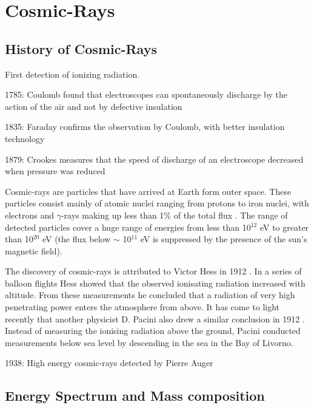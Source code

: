 \chapter[Cosmic-Rays]{\centering Cosmic-Rays \\}\label{Ch:Cosmic-rays}

\section{History of Cosmic-Rays}

First detection of ionizing radiation. 

1785: Coulomb found that 
electroscopes can spontaneously 
discharge by the action of the air 
and not by defective insulation

1835: Faraday confirms the 
observation by Coulomb, with 
better insulation technology

1879: Crookes measures that the 
speed of discharge of an 
electroscope decreased when 
pressure was reduced 

Cosmic-rays are particles that have arrived at Earth form outer space. These particles consist mainly of atomic nuclei ranging from protons to iron nuclei, with electrons and $\gamma$-rays making up less than 1\% of the total flux \cite{2007PhDT.........4Y}. The range of detected particles cover a huge range of energies from less than 10$^{12}$ eV to greater than 10$^{20}$ eV (the flux below $\sim$ 10$^{11}$ eV is suppressed by the presence of the sun's magnetic field).

The discovery of cosmic-rays is attributed to Victor Hess in 1912 \cite{hess}. In a series of balloon flights Hess showed that the observed ionisating radiation increased with altitude. From these measurements he concluded that a radiation of very high penetrating power enters the atmosphere from above. It has come to light recently \cite{arXiv1002.1810} that another physicist D. Pacini also drew a similar conclusion in 1912 \cite{2010arXiv1002.1810P}. Instead of measuring the ionising radiation above the ground, Pacini conducted measurements below sea level by descending in the sea in the Bay of Livorno.

1938: High energy cosmic-rays detected by Pierre Auger

\section{Energy Spectrum and Mass composition}

